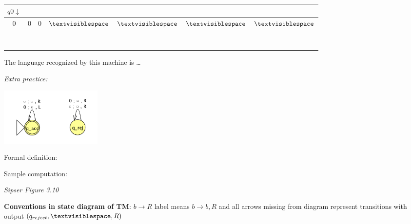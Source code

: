 \documentclass[12pt, oneside]{article}
\begin{document}
\begin{tabular}{|c|c|c|c|c|c|c|}
\hline
\multicolumn{1}{|c}{$q0\downarrow$} &  \multicolumn{6}{c|}{\phantom{A}}\\
\hline
$0$ & $0$  & $0$ & $\textvisiblespace $& $\textvisiblespace $& $\textvisiblespace $&  $\textvisiblespace $\\
\hline
\multicolumn{7}{|c|}{\phantom{A}}\\
\hline
\phantom{AA} & \phantom{AA}& \phantom{AA}& \phantom{AA}& \phantom{AA}& \phantom{AA}& \phantom{AA} \\
\hline
\multicolumn{7}{|c|}{\phantom{A}}\\
\hline
\phantom{AA} & \phantom{AA}& \phantom{AA}& \phantom{AA}& \phantom{AA}& \phantom{AA}& \phantom{AA} \\
\hline
\multicolumn{7}{|c|}{\phantom{A}}\\
\hline
\phantom{AA} & \phantom{AA}& \phantom{AA}& \phantom{AA}& \phantom{AA}& \phantom{AA}& \phantom{AA} \\
\hline
\multicolumn{7}{|c|}{\phantom{A}}\\
\hline
\phantom{AA} & \phantom{AA}& \phantom{AA}& \phantom{AA}& \phantom{AA}& \phantom{AA}& \phantom{AA} \\
\hline
\end{tabular}

\vfill

The language recognized by this machine is \ldots

{\it Extra practice:}

 \includegraphics[width=2in]{resources/machines/Lect13TM2.png} 


 Formal definition: 


 Sample computation: 
 

\newpage
{\it Sipser Figure  3.10}

{\bf Conventions in state diagram of TM}: $b \to R$ label means $b \to b, R$ and
all arrows missing from diagram represent transitions with output $(q_{reject}, \textvisiblespace , R)$
\end{document}
